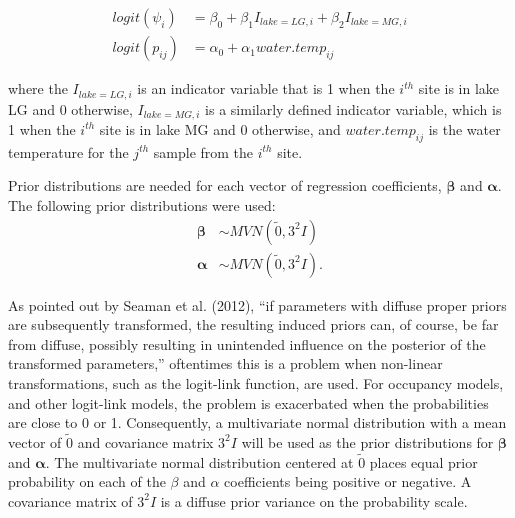 \documentclass[12pt]{article}\usepackage[]{graphicx}\usepackage[]{color}
\begin{document}
$$
\begin{aligned}
logit(\psi_i) &= \beta_0 + \beta_1I_{lake = LG, i} + \beta_2I_{lake = MG, i}\\
logit(p_{ij}) &= \alpha_0 + \alpha_1water.temp_{ij}
\end{aligned}
$$

\noindent where the $I_{lake = LG, i}$ is an indicator variable that is 1 when the $i^{th}$ site is in lake LG and 0 otherwise, $I_{lake = MG, i}$ is a similarly defined indicator variable, which is 1 when the $i^{th}$ site is in lake MG and 0 otherwise, and $water.temp_{ij}$ is the water temperature for the $j^{th}$ sample from the $i^{th}$ site. 

Prior distributions are needed for each vector of regression coefficients, $\bm\beta$ and $\bm\alpha$. The following prior distributions were used: 
$$
\begin{aligned}
\bm{\beta} &\sim MVN(\tilde 0, 3^2I)\\
\bm{\alpha} &\sim MVN(\tilde 0, 3^2I).
\end{aligned}
$$

\noindent As pointed out by Seaman et al. (2012), ``if parameters with diffuse proper priors are subsequently transformed, the resulting induced priors can, of course, be far from diffuse, possibly resulting in unintended influence on the posterior of the transformed parameters,'' oftentimes this is a problem when non-linear transformations, such as the logit-link function, are used. For occupancy models, and other logit-link models, the problem is exacerbated when the probabilities are close to 0 or 1. Consequently, a multivariate normal distribution with a mean vector of $\tilde 0$ and covariance matrix $3^2I$ will be used as the prior distributions for $\bm\beta$ and $\bm\alpha$. The multivariate normal distribution centered at $\tilde 0$ places equal prior probability on each of the $\beta$ and $\alpha$ coefficients being positive or negative. A covariance matrix of $3^2I$ is a diffuse prior variance on the probability scale. 
\end{document}
